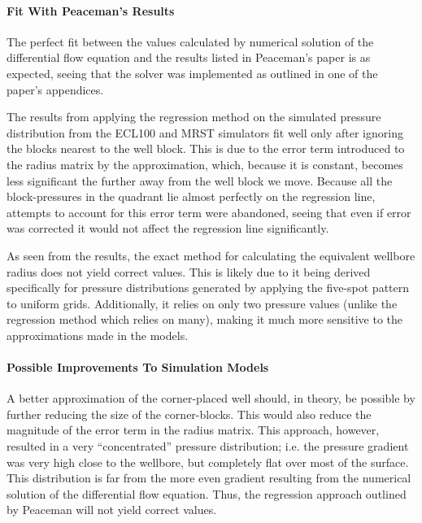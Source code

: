 \paragraph{Fit With Peaceman's Results} %
\label{par:fit_with_peaceman_s_results}
The perfect fit between the values calculated by numerical solution of the differential flow equation and the results listed in Peaceman's paper \cite{Peaceman1978Interpretation} is as expected, seeing that the solver was implemented as outlined in one of the paper's appendices.

The results from applying the regression method on the simulated pressure distribution from the ECL100 and MRST simulators fit well only after ignoring the blocks nearest to the well block. This is due to the error term introduced to the radius matrix by the approximation, which, because it is constant, becomes less significant the further away from the well block we move. Because all the block-pressures in the quadrant lie almost perfectly on the regression line, attempts to account for this error term were abandoned, seeing that even if error was corrected it would not affect the regression line significantly.

As seen from the results, the exact method for calculating the equivalent wellbore radius does not yield correct values. This is likely due to it being derived specifically for pressure distributions generated by applying the five-spot pattern to uniform grids. Additionally, it relies on only two pressure values (unlike the regression method which relies on many), making it much more sensitive to the approximations made in the models. 

\paragraph{Possible Improvements To Simulation Models} %
\label{par:possible_improvements_to_simulation_models}
A better approximation of the corner-placed well should, in theory, be possible by further reducing the size of the corner-blocks. This would also reduce the magnitude of the error term in the radius matrix. This approach, however, resulted in a very ``concentrated'' pressure distribution; i.e. the pressure gradient was very high  close to the wellbore, but completely flat over most of the surface. This distribution is far from the more even gradient resulting from the numerical solution of the differential flow equation. Thus, the regression approach outlined by Peaceman will not yield correct values.
 
